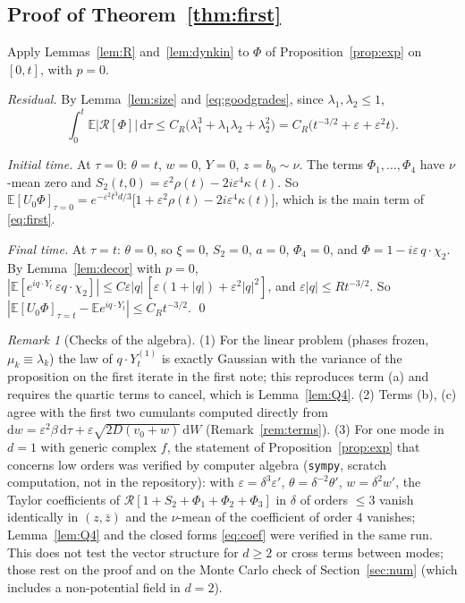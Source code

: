 \documentclass[11pt]{article}
\newcommand{\dd}{\mathrm{d}}
\newcommand{\E}{\mathbb{E}}
\newcommand{\eps}{\varepsilon}
\newcommand{\cR}{\mathcal{R}}
\theoremstyle{remark}
\newtheorem{remark}[theorem]{Remark}
\begin{document}
\subsection{Proof of Theorem~\ref{thm:first}}

Apply Lemmas~\ref{lem:R} and~\ref{lem:dynkin} to $\Phi$ of
Proposition~\ref{prop:exp} on $[0,t]$, with $p=0$.

\emph{Residual.} By Lemma~\ref{lem:size} and \eqref{eq:goodgrades}, since
$\lambda_1,\lambda_2\le1$,
\[
  \int_0^t\E|\cR[\Phi]|\,\dd\tau
  \le C_R\bigl(\lambda_1^3 + \lambda_1\lambda_2 + \lambda_2^2\bigr)
  = C_R\bigl(t^{-3/2} + \eps + \eps^2t\bigr).
\]

\emph{Initial time.} At $\tau=0$: $\theta=t$, $w=0$, $Y=0$, $z=b_0\sim\nu$.
The terms $\Phi_1,\dots,\Phi_4$ have $\nu$-mean zero and
$S_2(t,0) = \eps^2\rho(t) - 2i\eps^4\kappa(t)$. So
$\E[U_0\Phi]_{\tau=0} = e^{-\eps^2t^3d/3}\bigl[1 + \eps^2\rho(t) - 2i\eps^4\kappa(t)\bigr]$,
which is the main term of \eqref{eq:first}.

\emph{Final time.} At $\tau=t$: $\theta=0$, so $\xi=0$, $S_2 = 0$, $a=0$,
$\Phi_4=0$, and $\Phi = 1 - i\eps\,q\cdot\chi_2$. By Lemma~\ref{lem:decor}
with $p=0$,
$|\E[e^{iq\cdot Y_t}\,\eps q\cdot\chi_2]|\le C\eps|q|\,[\eps(1+|q|)+\eps^2|q|^2]$,
and $\eps|q|\le Rt^{-3/2}$. So
$|\E[U_0\Phi]_{\tau=t} - \E e^{iq\cdot Y_t}|\le C_Rt^{-3/2}$. \qed

\begin{remark}[Checks of the algebra]\label{rem:checks}
(1) For the linear problem (phases frozen, $\mu_k\equiv\lambda_k$) the law of
$q\cdot Y^{(1)}_t$ is exactly Gaussian with the variance of the proposition on the first iterate in
the first note; this reproduces term (a) and requires the quartic terms to
cancel, which is Lemma~\ref{lem:Q4}.
(2) Terms (b), (c) agree with the first two cumulants computed directly from
$\dd w = \eps^2\beta\,\dd\tau + \eps\sqrt{2D(v_0+w)}\,\dd W$
(Remark~\ref{rem:terms}).
(3) For one mode in $d=1$ with generic complex $f$, the statement of
Proposition~\ref{prop:exp} that concerns low orders was verified by computer
algebra (\texttt{sympy}, scratch computation, not in the repository): with
$\eps = \delta^3\eps'$, $\theta = \delta^{-2}\theta'$, $w = \delta^2w'$, the
Taylor coefficients of $\cR[1+S_2+\Phi_1+\Phi_2+\Phi_3]$ in $\delta$ of orders
$\le3$ vanish identically in $(z,\bar z)$ and the $\nu$-mean of the
coefficient of order $4$ vanishes; Lemma~\ref{lem:Q4} and the closed forms
\eqref{eq:coef} were verified in the same run. This does not test the vector
structure for $d\ge2$ or cross terms between modes; those rest on the proof
and on the Monte Carlo check of Section~\ref{sec:num} (which includes a
non-potential field in $d=2$).
\end{remark}
\end{document}
